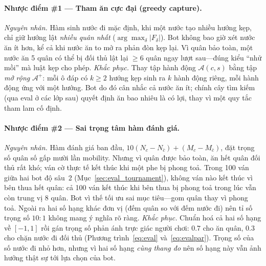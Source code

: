 \paragraph{Nhược điểm \#1 --- Tham ăn cực đại (greedy capture).}
\emph{Nguyên nhân.} Hàm sinh nước đi mặc định, khi một nước tạo nhiều
hướng kẹp, chỉ giữ hướng lật \emph{nhiều quân nhất} ($\arg\max_\delta
|F_\delta|$). Bot không bao giờ xét nước ăn ít hơn, kể cả khi nước ăn to
mở ra phản đòn kẹp lại. Vì quân bảo toàn, một nước ăn 5 quân có thể bị
đối thủ lật lại $\ge 6$ quân ngay lượt sau---đúng kiểu ``nhử mồi'' mà luật
kẹp cho phép.
\emph{Khắc phục.} Thay tập hành động $\mathcal A(c,s)$ bằng tập \emph{mở
rộng} $\mathcal A^{+}$: mỗi ô đáp có $k\ge 2$ hướng kẹp sinh ra $k$ hành
động riêng, mỗi hành động ứng với một hướng. Bot do đó cân nhắc cả nước
ăn ít; chính cây tìm kiếm (qua eval ở các lớp sau) quyết định ăn bao nhiêu
là có lợi, thay vì một quy tắc tham lam cố định.

\paragraph{Nhược điểm \#2 --- Sai trọng tâm hàm đánh giá.}
\emph{Nguyên nhân.} Hàm đánh giá ban đầu, $10(N_c-N_{\bar c})+(M_c-M_{\bar
c})$, đặt trọng số quân số gấp mười lần mobility. Nhưng vì quân được bảo toàn,
ăn hết quân đối thủ rất khó; ván cờ thực tế kết thúc khi một phe bị phong
toả. Trong 100 ván giữa hai bot độ sâu~2 (Mục~\ref{sec:eval_tournament}),
không ván nào kết thúc vì bên thua hết quân: cả 100 ván kết thúc khi bên
thua bị phong toả trong lúc vẫn còn trung vị 8 quân. Bot vì thế tối ưu sai
mục tiêu---gom quân thay vì phong toả.
Ngoài ra hai số hạng khác đơn vị (đếm quân so với đếm nước đi) nên tỉ số
trọng số $10\!:\!1$ không mang ý nghĩa rõ ràng.
\emph{Khắc phục.} Chuẩn hoá cả hai số hạng về $[-1,1]$ rồi gán trọng số
phản ánh trực giác người chơi: $0.7$ cho ăn quân, $0.3$ cho chặn nước đi
đối thủ (Phương trình~\eqref{eq:eval} và~\eqref{eq:evalpar}). Trọng số của số
nước đi nhỏ hơn, nhưng vì hai số hạng \emph{cùng thang đo} nên số hạng này
vẫn ảnh hưởng thật sự tới lựa chọn của bot.

